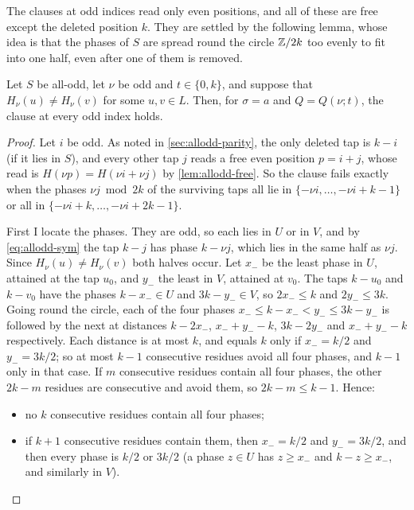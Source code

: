 The clauses at odd indices read only even positions, and all of these are free
except the deleted position $k$. They are settled by the following lemma,
whose idea is that the phases of $S$ are spread round the circle $\mathbb{Z}/2k$ too
evenly to fit into one half, even after one of them is removed.

\begin{lemma}
\label{lem:allodd-oddhalf}
Let $S$ be all-odd, let $\nu$ be odd and $t\in\{0,k\}$, and suppose that
$H_\nu(u)\ne H_\nu(v)$ for some $u,v\in L$. Then, for
$\sigma=a$ and $Q=Q(\nu;t)$, the clause at every odd index holds.
\end{lemma}

\begin{proof}
Let $i$ be odd. As noted in \autoref{sec:allodd-parity}, the only deleted
tap is $k-i$ (if it lies in $S$), and every other tap $j$ reads a free even
position $p=i+j$, whose read is $H(\nu p)=H(\nu i+\nu j)$ by \autoref{lem:allodd-free}.
So the clause fails exactly when the phases $\nu j\bmod2k$ of the surviving taps
all lie in $\{-\nu i,\dots,-\nu i+k-1\}$ or all in $\{-\nu i+k,\dots,-\nu i+2k-1\}$.

First I locate the phases. They are odd, so each lies in $U$ or in $V$, and
by \eqref{eq:allodd-sym} the tap $k-j$ has phase $k-\nu j$, which lies in the
same half as $\nu j$. Since $H_\nu(u)\ne H_\nu(v)$ both halves
occur. Let $x_-$ be the least phase in $U$, attained at the tap $u_0$, and
$y_-$ the least in $V$, attained at $v_0$. The taps $k-u_0$ and $k-v_0$ have
the phases $k-x_-\in U$ and $3k-y_-\in V$, so $2x_-\le k$ and $2y_-\le3k$.
Going round the circle, each of the four phases $x_-\le k-x_-<y_-\le3k-y_-$
is followed by the next at distances $k-2x_-$, $x_-+y_--k$, $3k-2y_-$ and
$x_-+y_--k$ respectively. Each distance is at most $k$, and equals $k$ only
if $x_-=k/2$ and $y_-=3k/2$; so at most $k-1$ consecutive residues avoid all
four phases, and $k-1$ only in that case. If $m$ consecutive residues contain
all four phases, the other $2k-m$ residues are consecutive and avoid them, so
$2k-m\le k-1$. Hence:
\begin{itemize}
\item[(a)] no $k$ consecutive residues contain all four phases;
\item[(b)] if $k+1$ consecutive residues contain them, then $x_-=k/2$ and
$y_-=3k/2$, and then every phase is $k/2$ or $3k/2$ (a phase $z\in U$ has
$z\ge x_-$ and $k-z\ge x_-$, and similarly in $V$).
\end{itemize}


\end{proof}
